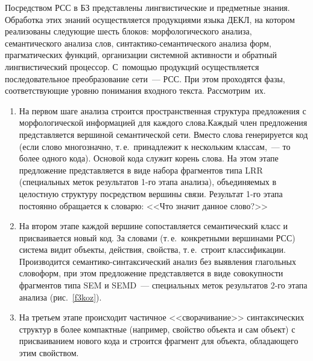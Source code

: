 \begin{multicols}{2}
     
     Посредством РСС в БЗ представлены лингвистические  и 
предметные знания. Обработка этих знаний осуществляется 
продукциями языка ДЕКЛ, на котором реализованы сле\-ду\-ющие шесть 
блоков: морфологического анализа, семанти\-ческого анализа слов, 
син\-так\-ти\-ко-се\-ман\-ти\-че\-ско\-го анализа форм, 
прагматических функций, организации системной активности и 
обратный лингвистический процессор. С~помощью продукций 
осущест\-вля\-ет\-ся последовательное преобразование сети~--- РСС. При этом 
проходятся фазы, соответствующие уровню понимания входного текста. 
Рас\-смот\-рим~их.
     \begin{enumerate}[1.]
     \item На первом шаге анализа строится 
пространственная структура предложения с морфологической информацией 
для каждого слова.\linebreak Каж\-дый член предложения представляется вершиной 
семантической сети. Вместо слова генерируется код (если слово 
многозначно, т.\,е.\ принадлежит к нескольким классам,~--- то более одного 
кода). Основой кода служит корень слова. На этом этапе предложение 
представляется в виде набора фрагментов типа LRR (специальных меток 
результатов 1-го этапа анализа), объединяемых в целостную структуру 
посредством вершины связи. Результат 1-го этапа постоянно обращается к 
словарю: <<Что значит данное слово?>>
     \item На втором этапе каждой вершине сопоставляется семантический 
класс и присваивается новый код. За словами (т.\,е.\ конкретными вершинами 
РСС) система видит объекты, действия, свойства, т.\,е.\ строит 
классификации. Производится се\-ман\-ти\-ко-син\-так\-си\-че\-ский анализ 
без выявления глагольных словоформ, при этом предложение представляется 
в виде совокупности фрагментов типа SEM и SEMD~--- специальных меток 
результатов 2-го этапа анализа (рис.~\ref{f3koz}).
     \item На третьем этапе происходит частичное <<сворачивание>> 
синтаксических структур в более компактные (например, свойство объекта и 
сам объект) с присваиванием нового кода и строится фрагмент для объекта, 
обладающего этим свойством.
     \begin{figure*}[b] %
          \vspace*{12pt}
\begin{center}
\mbox{%
\epsfxsize=147.485mm
}
\end{center}
\vspace*{-9pt}

\end{figure*}
\end{enumerate}
\end{multicols}
